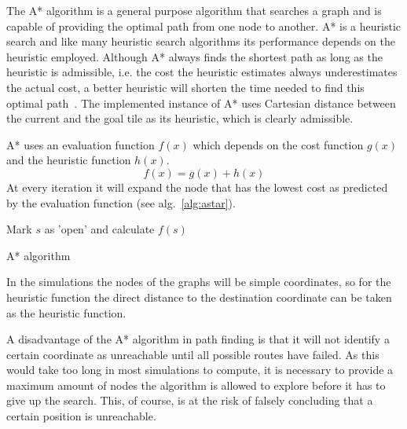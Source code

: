 			The A* algorithm is a general purpose algorithm that searches a graph and is capable of providing the optimal path from one node to another. A* is a heuristic search and like many heuristic search algorithms its performance depends on the heuristic employed. Although A* always finds the shortest path as long as the heuristic is admissible, i.e. the cost the heuristic estimates always underestimates the actual cost, a better heuristic will shorten the time needed to find this optimal path~\cite{hart1968}. The implemented instance of A* uses Cartesian distance between the current and the goal tile as its heuristic, which is clearly admissible.

			A* uses an evaluation function $f(x)$ which depends on the cost function $g(x)$ and the heuristic function $h(x)$.
			\begin{equation}
				\label{eq:astarevaluation}
			 	f(x) = g(x) + h(x)
			\end{equation} 
			At every iteration it will expand the node that has the lowest cost as predicted by the evaluation function (see alg.~\ref{alg:astar}).

			\begin{algorithm}
				Mark $s$ as 'open' and calculate $f(s)$\;
				\caption{A* algorithm~\protect\cite{hart1968}}
				\label{alg:astar}
			\end{algorithm}

			In the simulations the nodes of the graphs will be simple coordinates, so for the heuristic function the direct distance to the destination coordinate can be taken as the heuristic function.

			A disadvantage of the A* algorithm in path finding is that it will not identify a certain coordinate as unreachable until all possible routes have failed. As this would take too long in most simulations to compute, it is necessary to provide a maximum amount of nodes the algorithm is allowed to explore before it has to give up the search. This, of course, is at the risk of falsely concluding that a certain position is unreachable.

